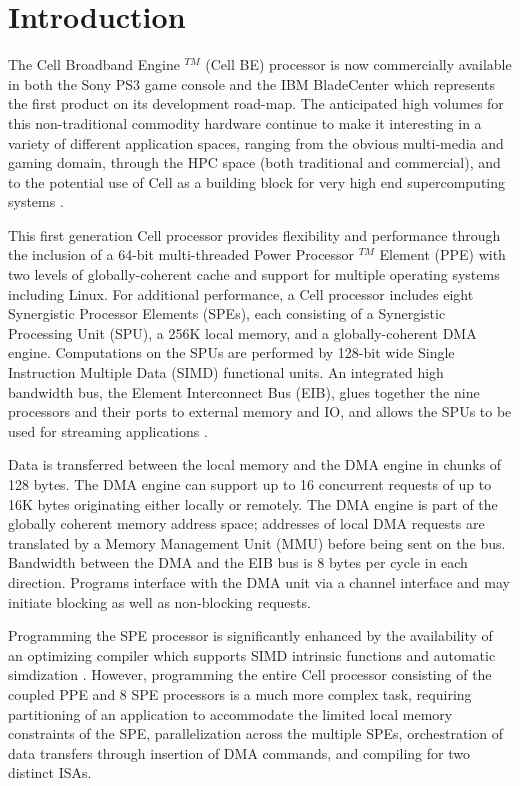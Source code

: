 \section{Introduction}

The Cell Broadband Engine $^{TM}$ (Cell BE) processor \cite{DP05} is now
commercially available in both the Sony PS3 game console and the IBM BladeCenter
which represents the first product on its development road-map. The
anticipated high volumes for this non-traditional commodity hardware continue
to make it interesting in a variety of different application spaces, ranging
from the obvious multi-media and gaming domain, through the HPC space (both
traditional and commercial), and to the potential use of Cell as a building
block for very high end supercomputing systems \cite{Wil06}. 

This first generation Cell processor provides flexibility and performance
through the inclusion of a 64-bit multi-threaded Power Processor $^{TM}$
Element (PPE) with two levels of globally-coherent cache and support for
multiple operating systems including Linux. For additional performance, a Cell
processor includes eight Synergistic Processor Elements (SPEs), each consisting
of a Synergistic Processing Unit (SPU), a 256K local memory,
and a globally-coherent DMA engine.
Computations on the SPUs are performed by 128-bit wide Single Instruction
Multiple Data (SIMD) functional units. An integrated high bandwidth bus, the
Element Interconnect Bus (EIB), glues together the nine processors and their
ports to external memory and IO, and allows the SPUs to be used for streaming
applications \cite{MG06}.

Data is transferred between the local memory and the DMA engine \cite{Kis06} in
chunks of 128 bytes. The DMA engine can support up to 16 concurrent requests of
up to 16K bytes originating either locally or remotely. The DMA engine is part
of the globally coherent memory address space; addresses of local DMA requests
are translated by a Memory Management Unit (MMU) before being sent on the bus.
Bandwidth between the DMA and the EIB bus is 8 bytes per cycle in each
direction. Programs interface with the DMA unit via a channel interface and
may initiate blocking as well as non-blocking requests.

Programming the SPE processor is significantly enhanced by the
availability of an optimizing compiler which supports SIMD intrinsic
functions and automatic simdization \cite{AE03}. However, programming
the entire Cell processor consisting of the coupled PPE and 8 SPE
processors is a much more complex task, requiring partitioning of an
application to accommodate the limited local memory constraints of the
SPE, parallelization across the multiple SPEs, orchestration of data
transfers through insertion of DMA commands, and compiling for two
distinct ISAs.

